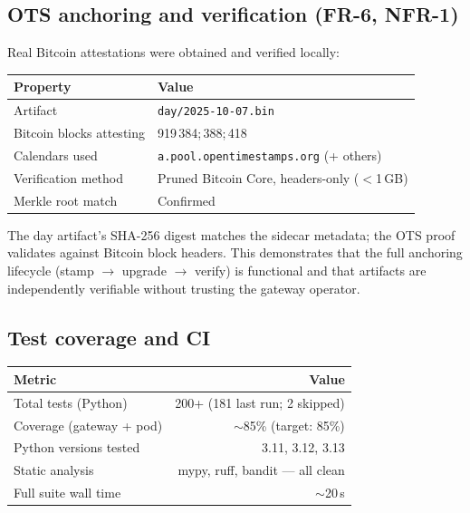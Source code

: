 \subsection{OTS anchoring and verification (FR-6, NFR-1)}

Real Bitcoin attestations were obtained and verified locally:

\begin{center}
    \small
    \begin{tabular}{ll}
        \toprule
        \textbf{Property} & \textbf{Value} \\
        \midrule
        Artifact                    & \texttt{day/2025-10-07.bin} \\
        Bitcoin blocks attesting    & 919\,384;\; 919\,388;\; 919\,418 \\
        Calendars used              & \texttt{a.pool.opentimestamps.org} (+ others) \\
        Verification method         & Pruned Bitcoin Core, headers-only ($<$1\,GB) \\
        Merkle root match           & Confirmed \\
        \bottomrule
    \end{tabular}
\end{center}

The day artifact's \ac{SHA}-256 digest matches the sidecar metadata; the
\ac{OTS} proof validates against Bitcoin block headers.
This demonstrates
that the full anchoring lifecycle (stamp $\rightarrow$ upgrade
$\rightarrow$ verify) is functional and that artifacts are
independently verifiable without trusting the gateway operator.

\subsection{Test coverage and CI}

\begin{center}
    \small
    \begin{tabular}{lr}
        \toprule
        \textbf{Metric} & \textbf{Value} \\
        \midrule
        Total tests (Python)        & 200+ (181 last run; 2 skipped) \\
        Coverage (gateway + pod)    & $\sim$85\% (target: 85\%) \\
        Python versions tested      & 3.11, 3.12, 3.13 \\
        Static analysis             & mypy, ruff, bandit — all clean \\
        Full suite wall time        & $\sim$20\,s \\
        \bottomrule
    \end{tabular}
\end{center}

